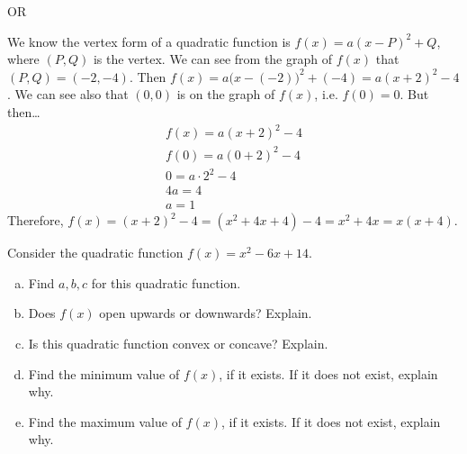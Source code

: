 \documentclass[11pt,letterpaper]{article}
\begin{document}
\begin{center} OR \end{center} \pvspace{0.3cm}

We know the vertex form of a quadratic function is $f(x)= a(x - P)^2 + Q$, where $(P, Q)$ is the vertex. We can see from the graph of $f(x)$ that $(P, Q)= (-2, -4)$. Then $f(x)= a \big(x - (-2) \big)^2 + (-4)= a (x + 2)^2 - 4$. We can see also that $(0, 0)$ is on the graph of $f(x)$, i.e. $f(0)= 0$. But then\dots
	\[
	\begin{gathered}
	f(x)= a(x + 2)^2 - 4 \\
	f(0)= a (0 + 2)^2 - 4 \\
	0= a \cdot 2^2 - 4 \\
	4a= 4 \\
	a= 1
	\end{gathered}
	\]
Therefore, $f(x)= (x + 2)^2 - 4= (x^2 + 4x + 4) - 4= x^2 + 4x= x(x + 4)$. 



\newpage



 Consider the quadratic function $f(x)= x^2 - 6x + 14$.
	\begin{enumerate}[(a)]
	\item Find $a, b, c$ for this quadratic function.
	\item Does $f(x)$ open upwards or downwards? Explain.
	\item Is this quadratic function convex or concave? Explain. 
	\item Find the minimum value of $f(x)$, if it exists. If it does not exist, explain why.  
	\item Find the maximum value of $f(x)$, if it exists. If it does not exist, explain why. 
	\end{enumerate} \pspace
\end{document}
